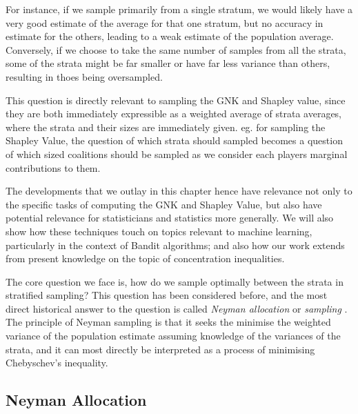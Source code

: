 For instance, if we sample primarily from a single stratum, we would likely have a very good estimate of the average for that one stratum, but no accuracy in estimate for the others, leading to a weak estimate of the population average.
Conversely, if we choose to take the same number of samples from all the strata, some of the strata might be far smaller or have far less variance than others, resulting in thoes being oversampled.

This question is directly relevant to sampling the GNK and Shapley value, since they are both immediately expressible as a weighted average of strata averages, where the strata and their sizes are immediately given. eg. for sampling the Shapley Value, the question of which strata should sampled becomes a question of which sized coalitions should be sampled as we consider each players marginal contributions to them.

The developments that we outlay in this chapter hence have relevance not only to the specific tasks of computing the GNK and Shapley Value, but also have potential relevance for statisticians and statistics more generally.
We will also show how these techniques touch on topics relevant to machine learning, particularly in the context of Bandit algorithms; and also how our work extends from present knowledge on the topic of concentration inequalities.

The core question we face is, how do we sample optimally between the strata in stratified sampling?
This question has been considered before, and the most direct historical answer to the question is called \textit{Neyman allocation} or \textit{sampling} \cite{1938.10503378,10.2307/23339498}.
The principle of Neyman sampling is that it seeks the minimise the weighted variance of the population estimate assuming knowledge of the variances of the strata, and it can most directly be interpreted as a process of minimising Chebyschev's inequality.

\subsection{Neyman Allocation}

